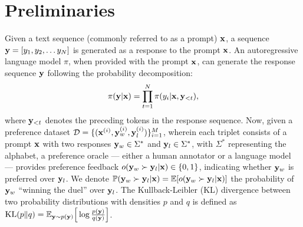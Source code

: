 \section{Preliminaries}
\label{Preliminaries}
Given a text sequence (commonly referred to as a prompt) $\mathbf{x}$, a sequence $\mathbf{y} = [y_1, y_2, \dots y_N]$ is generated as a response to the prompt $\mathbf{x}$.  
An autoregressive language model $\pi$, when provided with the prompt $\mathbf{x}$, can generate the response sequence $\mathbf{y}$ following the probability decomposition:
\begin{equation}
    \pi(\mathbf{y}|\mathbf{x}) = \prod_{t=1}^{N}\pi(y_i|\mathbf{x}, \mathbf{y}_{<t}),
\end{equation}
where $\mathbf{y}_{<t}$ denotes the preceding tokens in the response sequence.
Now, given a preference dataset $\mathcal{D} = \{ (\mathbf{x}^{(i)}, \mathbf{y}_w^{(i)}, \mathbf{y}_l^{(i)}) \}_{i=1}^{M}$, wherein each triplet consists of a prompt $\mathbf{x}$ with two responses $\mathbf{y}_w\in\Sigma^{*}$ and $\mathbf{y}_l\in\Sigma^{*}$, with $\Sigma^{*}$ representing the alphabet, a preference oracle --- either a human annotator or a language model --- provides preference feedback $o(\mathbf{y}_w \succ \mathbf{y}_l |\mathbf{x}) \in \{0,1\}$, indicating whether $\mathbf{y}_w$ is preferred over $\mathbf{y}_l$. We denote $\mathbb{P}(\mathbf{y}_w \succ \mathbf{y}_l| \mathbf{x}) = \mathbb{E}[o(\mathbf{y}_w \succ \mathbf{y}_l|\mathbf{x})]$ the probability of $\mathbf{y}_w$ ``winning the duel'' over $\mathbf{y}_l$. The Kullback-Leibler (KL) divergence between two probability distributions with densities $p$ and $q$ is defined as $\mathrm{KL}(p \| q) = \mathbb{E}_{\mathbf{y} \sim p(\mathbf{y})} \Big[\log \frac{p(\mathbf{y})}{q(\mathbf{y})} \Big]$.



